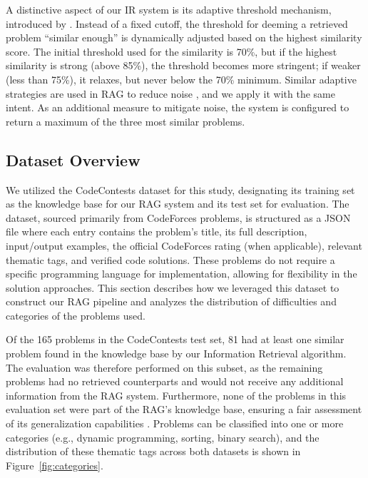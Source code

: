 \documentclass[preprint,12pt]{elsarticle}
\begin{document}
A distinctive aspect of our IR system is its adaptive threshold mechanism, introduced by \cite{ReEffIRDinamicoIntroduzido}. Instead of a fixed cutoff, the threshold for deeming a retrieved problem ``similar enough'' is dynamically adjusted based on the highest similarity score. The initial threshold used for the similarity is 70\%, but if the highest similarity is strong (above 85\%), the threshold becomes more stringent; if weaker (less than 75\%), it relaxes, but never below the 70\% minimum. Similar adaptive strategies are used in RAG to reduce noise \cite{IRthreshold}, and we apply it with the same intent. As an additional measure to mitigate noise, the system is configured to return a maximum of the three most similar problems.

\subsection{Dataset Overview}
\label{subsec:dataset}

We utilized the CodeContests dataset \cite{li2022competition} for this study, designating its training set as the knowledge base for our RAG system and its test set for evaluation. The dataset, sourced primarily from CodeForces problems, is structured as a JSON file where each entry contains the problem's title, its full description, input/output examples, the official CodeForces rating (when applicable), relevant thematic tags, and verified code solutions. These problems do not require a specific programming language for implementation, allowing for flexibility in the solution approaches. This section describes how we leveraged this dataset to construct our RAG pipeline and analyzes the distribution of difficulties and categories of the problems used.

Of the 165 problems in the CodeContests test set, 81 had at least one similar problem found in the knowledge base by our Information Retrieval algorithm. The evaluation was therefore performed on this subset, as the remaining problems had no retrieved counterparts and would not receive any additional information from the RAG system. Furthermore, none of the problems in this evaluation set were part of the RAG’s knowledge base, ensuring a fair assessment of its generalization capabilities \cite{RAGIntroduction, gao2023retrieval, soares2025machine, miranda2023projeto}. Problems can be classified into one or more categories (e.g., dynamic programming, sorting, binary search), and the distribution of these thematic tags across both datasets is shown in Figure~\ref{fig:categories}.
\end{document}
